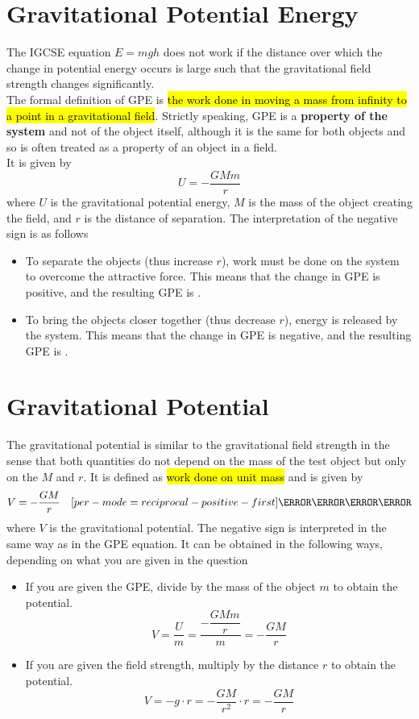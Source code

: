 \documentclass[a4paper,12pt]{article}
\let\oldsection\section
\renewcommand\section{\clearpage\oldsection}
\let\oldsi\si
\renewcommand{\si}[1]{\oldsi[per-mode=reciprocal-positive-first]{#1}}
\newcommand{\lb}{\\[8pt]}
\begin{document}
\section{Gravitational Potential Energy}

The IGCSE equation $E = mgh$ does not work if the distance over which the change in potential energy occurs is large such that the gravitational field strength changes significantly.\lb
The formal definition of GPE is \hl{the work done in moving a mass from infinity to a point in a gravitational field}. Strictly speaking, GPE is a \textbf{property of the system} and not of the object itself, although it is the same for both objects and so is often treated as a property of an object in a field.\lb
It is given by
$$U = -\frac{GMm}{r}$$
where $U$ is the gravitational potential energy, $M$ is the mass of the object creating the field, and $r$ is the distance of separation. The interpretation of the negative sign is as follows
\begin{itemize}
  \item To separate the objects (thus increase $r$), work must be done on the system to overcome the attractive force. This means that the change in GPE is positive, and the resulting GPE is .
  \item To bring the objects closer together (thus decrease $r$), energy is released by the system. This means that the change in GPE is negative, and the resulting GPE is .
\end{itemize}

\section{Gravitational Potential}

The gravitational potential is similar to the gravitational field strength in the sense that both quantities do not depend on the mass of the test object but only on the $M$ and $r$. It is defined as \hl{work done on unit mass} and is given by
$$V = -\frac{GM}{r}\quad \si{\J\per\kilo\g}$$
where $V$ is the gravitational potential. The negative sign is interpreted in the same way as in the GPE equation.
It can be obtained in the following ways, depending on what you are given in the question
\begin{itemize}
  \item If you are given the GPE, divide by the mass of the object $m$ to obtain the potential.
        $$V = \frac{U}{m} = \frac{-\dfrac{GMm}{r}}{m} = -\frac{GM}{r}$$
  \item If you are given the field strength, multiply by the distance $r$ to obtain the potential.
        $$V = -g \cdot r = -\frac{GM}{r^2} \cdot r = -\frac{GM}{r}$$
\end{itemize}
\end{document}
